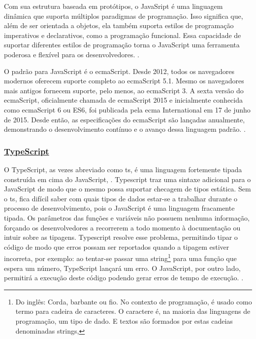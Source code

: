 Com sua estrutura baseada em protótipos, o JavaSript é uma linguagem dinâmica que
suporta múltiplos paradigmas de programação. Isso significa que, além de ser orientada a
objetos, ela também suporta estilos de programação imperativos e declarativos, como a
programação funcional. Essa capacidade de suportar diferentes estilos de programação torna o
JavaScript uma ferramenta poderosa e flexível para os desenvolvedores.
\cite{mdn-js}.

O padrão para JavaScript é o
\acrshort{ecma}Script.
Desde 2012, todos os navegadores
modernos oferecem suporte completo ao
\acrshort{ecma}Script 5.1. Mesmo os navegadores mais
antigos fornecem suporte, pelo menos, ao
\acrshort{ecma}Script 3. A sexta versão do
\acrshort{ecma}Script,
oficialmente chamada de
\acrshort{ecma}Script 2015 e inicialmente conhecida como
\acrshort{ecma}Script 6
ou ES6, foi publicada pela \acrshort{ecma} International
em 17 de junho de 2015. Desde então, as
especificações do
\acrshort{ecma}Script são lançadas anualmente, demonstrando o desenvolvimento
contínuo e o avanço dessa linguagem padrão.
\cite{mdn-js}.

\subsubsection{\underline{TypeScript}}

O TypeScript, as vezes abreviado como
\acrshort{ts}, é uma linguagem fortemente
tipada construída em cima do JavaScript,
\cite{ts-page}.
Typescript traz uma sintaxe adicional para o JavaScript de modo
que o mesmo possa suportar checagem de tipos estática.
Sem o \acrshort{ts},
fica difícil saber com quais tipos de dados estar-se a trabalhar
durante o processo de desenvolvimento, pois o JavaScript é uma
linguagem fracamente tipada. Os parâmetros das funções e variáveis
não possuem nenhuma informação, forçando os desenvolvedores
a recorrerem a todo momento à documentação ou intuir sobre
as tipagens.
Typescript resolve esse problema, permitindo tipar o código
de modo que erros possam ser reportados quando a tipagem estiver
incorreta, por exemplo: ao tentar-se passar uma
string\footnote{Do inglês: Corda, barbante ou fio. No contexto de programação,
    é usado como termo para cadeira de caracteres. O caractere é, na
    maioria das linguagens de programação, um tipo de dado. E textos
    são formados por estas cadeias denominadas strings,
}
para uma função que espera um número, TypeScript lançará um erro.
O JavaScript, por outro lado, permitirá a execução deste código
podendo gerar erros de tempo de execução.
\cite{ts-w3}.

